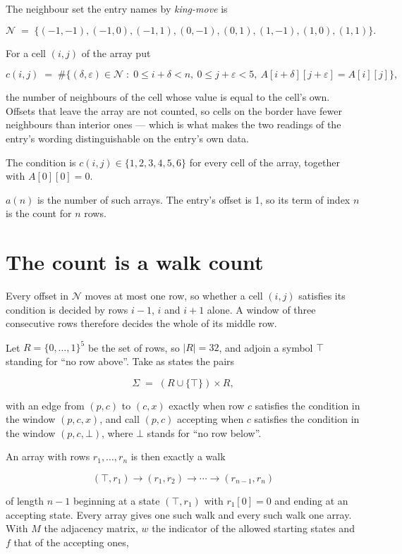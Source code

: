 \documentclass[11pt]{article}
\theoremstyle{definition}
\begin{document}
The neighbour set the entry names by {\itshape king-move} is

\[\mathcal{N} \;=\; \{(-1,-1), (-1,0), (-1,1), (0,-1), (0,1), (1,-1), (1,0), (1,1)\}.\]

For a cell $(i,j)$ of the array put

\[c(i,j) \;=\; \#\bigl\{(\delta,\varepsilon)\in\mathcal{N} \;:\; 0\le i+\delta<n,\ 0\le j+\varepsilon<5,\ A[i+\delta][j+\varepsilon] = A[i][j]\bigr\},\]

the number of neighbours of the cell whose value is equal to the cell's own. Offsets that leave the array are not counted, so cells on the border have fewer neighbours than interior ones --- which is what makes the two readings of the entry's wording distinguishable on the entry's own data.

The condition is $c(i,j) \in \{1, 2, 3, 4, 5, 6\}$ for every cell of the array, together with $A[0][0]=0$.

$a(n)$ is the number of such arrays. The entry's offset is 1, so its term of index $n$ is the count for $n$ rows.

\section{The count is a walk count}

Every offset in $\mathcal{N}$ moves at most one row, so whether a cell $(i,j)$ satisfies its condition is decided by rows $i-1$, $i$ and $i+1$ alone. A window of three consecutive rows therefore decides the whole of its middle row.

Let $R = \{0,\dots,1\}^{5}$ be the set of rows, so $|R| = 32$, and adjoin a symbol $\top$ standing for ``no row above''. Take as states the pairs

\[\Sigma \;=\; (R \cup \{\top\}) \times R,\]

with an edge from $(p,c)$ to $(c,x)$ exactly when row $c$ satisfies the condition in the window $(p,c,x)$, and call $(p,c)$ accepting when $c$ satisfies the condition in the window $(p,c,\bot)$, where $\bot$ stands for ``no row below''.

An array with rows $r_1,\dots,r_n$ is then exactly a walk

\[(\top,r_1) \to (r_1,r_2) \to \cdots \to (r_{n-1},r_n)\]

of length $n-1$ beginning at a state $(\top,r_1)$ with $r_1[0]=0$ and ending at an accepting state. Every array gives one such walk and every such walk one array. With $M$ the adjacency matrix, $w$ the indicator of the allowed starting states and $f$ that of the accepting ones,
\end{document}
